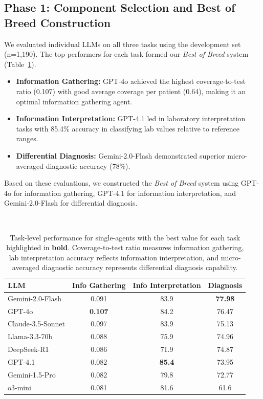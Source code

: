 \documentclass[manuscript, nonacm]{acmart}
\begin{document}
\subsection{Phase 1: Component Selection and Best of Breed Construction}
We evaluated individual LLMs on all three tasks using the development set (n=1,190). The top performers for each task formed our \textit{Best of Breed} system (Table~\ref{tab:single_agent_performance}).

\begin{itemize}
    \item \textbf{Information Gathering:} GPT-4o achieved the highest coverage-to-test ratio (0.107) with good average coverage per patient (0.64), making it an optimal information gathering agent.
    
    \item \textbf{Information Interpretation:} GPT-4.1 led in laboratory interpretation tasks with 85.4\% accuracy in classifying lab values relative to reference ranges.
    
    \item \textbf{Differential Diagnosis:} Gemini-2.0-Flash demonstrated superior micro-averaged diagnostic accuracy (78\%).
\end{itemize}

Based on these evaluations, we constructed the \textit{Best of Breed} system using GPT-4o for information gathering, GPT-4.1 for information interpretation, and Gemini-2.0-Flash for differential diagnosis.

\

\begin{table}[htbp]
\centering
\small
\begin{tabular}{lccc}
\hline
\textbf{LLM} & \textbf{Info Gathering} & \textbf{Info Interpretation} & \textbf{Diagnosis} \\
\hline
Gemini-2.0-Flash & 0.091 & 83.9 & \textbf{77.98} \\
GPT-4o & \textbf{0.107} & 84.2 & 76.47 \\
Claude-3.5-Sonnet & 0.097 & 83.9 & 75.13 \\
Llama-3.3-70b & 0.088 & 75.9 & 74.96 \\
DeepSeek-R1 & 0.086 & 71.9 & 74.87 \\
GPT-4.1 & 0.082 & \textbf{85.4} & 73.95 \\
Gemini-1.5-Pro & 0.082 & 79.8 & 72.77 \\
o3-mini & 0.081 & 81.6 & 61.6 \\
\hline
\end{tabular}
\caption{Task-level performance for single-agents with the best value for each task highlighted in \textbf{bold}. Coverage-to-test ratio measures information gathering, lab interpretation accuracy reflects information interpretation, and micro-averaged diagnostic accuracy represents differential diagnosis capability.}
\label{tab:single_agent_performance}
\end{table}
\end{document}
